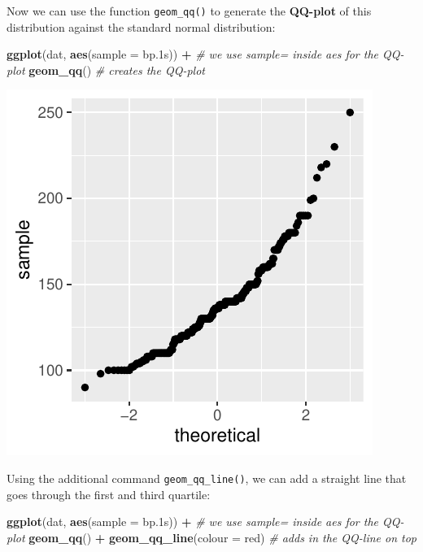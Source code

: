 \documentclass[
]{book}
\newenvironment{Shaded}{\begin{snugshade}}{\end{snugshade}}
\newcommand{\AttributeTok}[1]{\textcolor[rgb]{0.13,0.29,0.53}{#1}}
\newcommand{\CommentTok}[1]{\textcolor[rgb]{0.56,0.35,0.01}{\textit{#1}}}
\newcommand{\FloatTok}[1]{\textcolor[rgb]{0.00,0.00,0.81}{#1}}
\newcommand{\FunctionTok}[1]{\textcolor[rgb]{0.13,0.29,0.53}{\textbf{#1}}}
\newcommand{\NormalTok}[1]{#1}
\newcommand{\SpecialCharTok}[1]{\textcolor[rgb]{0.81,0.36,0.00}{\textbf{#1}}}
\newcommand{\StringTok}[1]{\textcolor[rgb]{0.31,0.60,0.02}{#1}}
\begin{document}
Now we can use the function \texttt{geom\_qq()} to generate the \textbf{QQ-plot} of this distribution against the standard normal distribution:

\begin{Shaded}
\begin{Highlighting}[]
\FunctionTok{ggplot}\NormalTok{(dat,}
       \FunctionTok{aes}\NormalTok{(}\AttributeTok{sample =}\NormalTok{ bp}\FloatTok{.1}\NormalTok{s)) }\SpecialCharTok{+}     \CommentTok{\# we use sample= inside aes for the QQ{-}plot}
  \FunctionTok{geom\_qq}\NormalTok{()                       }\CommentTok{\# creates the QQ{-}plot}
\end{Highlighting}
\end{Shaded}

\includegraphics{_main_files/figure-latex/unnamed-chunk-51-1.pdf}

Using the additional command \texttt{geom\_qq\_line()}, we can add a straight line that goes through the first and third quartile:

\begin{Shaded}
\begin{Highlighting}[]
\FunctionTok{ggplot}\NormalTok{(dat,}
       \FunctionTok{aes}\NormalTok{(}\AttributeTok{sample =}\NormalTok{ bp}\FloatTok{.1}\NormalTok{s)) }\SpecialCharTok{+}     \CommentTok{\# we use sample= inside aes for the QQ{-}plot}
  \FunctionTok{geom\_qq}\NormalTok{() }\SpecialCharTok{+}
  \FunctionTok{geom\_qq\_line}\NormalTok{(}\AttributeTok{colour =} \StringTok{\textquotesingle{}red\textquotesingle{}}\NormalTok{)                  }\CommentTok{\# adds in the QQ{-}line on top}
\end{Highlighting}
\end{Shaded}
\end{document}

